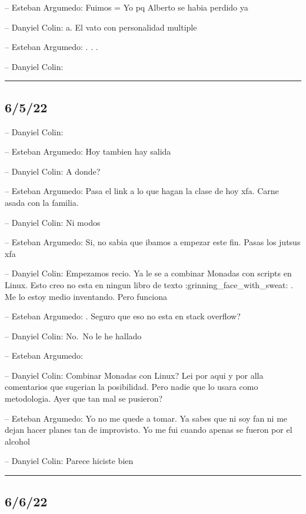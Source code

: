 -- Esteban Argumedo: Fuimos = Yo pq Alberto se habia perdido ya

-- Danyiel Colin: a. El vato con personalidad multiple

-- Esteban Argumedo: . . .

-- Danyiel Colin:

\begin{center}\rule{0.5\linewidth}{0.5pt}\end{center}

\hypertarget{section-95}{%
\subsection{6/5/22}\label{section-95}}

-- Danyiel Colin:

-- Esteban Argumedo: Hoy tambien hay salida

-- Danyiel Colin: A donde?

-- Esteban Argumedo: Pasa el link a lo que hagan la clase de hoy xfa.
Carne asada con la familia.

-- Danyiel Colin: Ni modos

-- Esteban Argumedo: Si, no sabia que ibamos a empezar este fin. Pasas
los jutsus xfa

-- Danyiel Colin: Empezamos recio. Ya le se a combinar Monadas con
scripts en Linux. Esto creo no esta en ningun libro de texto
:grinning\_face\_with\_sweat: . Me lo estoy medio inventando. Pero
funciona

-- Esteban Argumedo: . Seguro que eso no esta en stack overflow?

-- Danyiel Colin: No.~No le he hallado

-- Esteban Argumedo:

-- Danyiel Colin: Combinar Monadas con Linux? Lei por aqui y por alla
comentarios que sugerian la posibilidad. Pero nadie que lo usara como
metodologia. Ayer que tan mal se pusieron?

-- Esteban Argumedo: Yo no me quede a tomar. Ya sabes que ni soy fan ni
me dejan hacer planes tan de improvisto. Yo me fui cuando apenas se
fueron por el alcohol

-- Danyiel Colin: Parece hiciste bien

\begin{center}\rule{0.5\linewidth}{0.5pt}\end{center}

\hypertarget{section-96}{%
\subsection{6/6/22}\label{section-96}}

